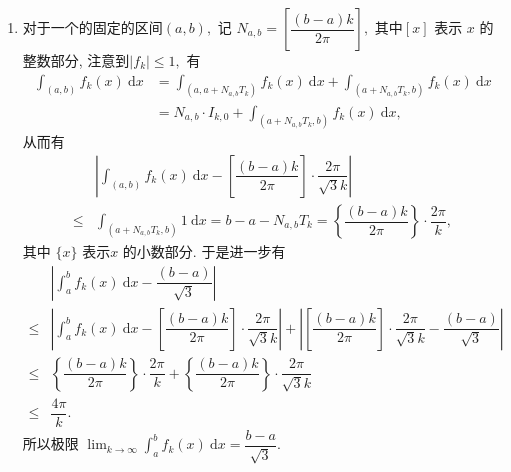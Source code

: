 \begin{solution}
\begin{enumerate}
\item 对于一个的固定的区间$(a, b),$ 记 $N_{a, b} = \left[\dfrac{(b-a)k}{2\pi} \right],$ 其中$[ x ]$ 表示 $x$ 的整数部分, 注意到$|f_k| \leqslant 1,$ 有
\begin{equation*}
\begin{aligned}
\int_{(a, b)} f_k(x) ~ \mathrm{d} x
& = \int_{(a, a + N_{a, b}T_k)} f_k(x) ~ \mathrm{d} x + \int_{(a + N_{a, b}T_k, b)} f_k(x) ~ \mathrm{d} x \\
& = N_{a, b} \cdot I_{k, 0} + \int_{(a + N_{a, b}T_k, b)} f_k(x) ~ \mathrm{d} x,
\end{aligned}
\end{equation*}
从而有
\begin{equation*}
\begin{aligned}
& \left\lvert \int_{(a, b)} f_k(x) ~ \mathrm{d} x - \left[\dfrac{(b-a)k}{2\pi} \right] \cdot \dfrac{2\pi}{\sqrt{3} k} \right\rvert \\
\leqslant & \int_{(a + N_{a, b}T_k, b)} 1 ~ \mathrm{d} x = b - a - N_{a, b}T_k
= \left\{ \dfrac{(b-a)k}{2\pi} \right\} \cdot \dfrac{2\pi}{k},
\end{aligned}
\end{equation*}
其中 $\{ x \}$ 表示$x$ 的小数部分. 于是进一步有
\begin{equation*}
\begin{aligned}
& \left\lvert \int_a^b f_k(x) ~ \mathrm{d} x - \dfrac{(b-a)}{\sqrt{3}} \right\rvert \\
\leqslant & \left\lvert \int_a^b f_k(x) ~ \mathrm{d} x - \left[\dfrac{(b-a)k}{2\pi} \right] \cdot \dfrac{2\pi}{\sqrt{3} k} \right\rvert
 + \left\lvert \left[\dfrac{(b-a)k}{2\pi} \right] \cdot \dfrac{2\pi}{\sqrt{3} k} - \dfrac{(b-a)}{\sqrt{3}} \right\rvert \\
\leqslant & \left\{ \dfrac{(b-a)k}{2\pi} \right\} \cdot \dfrac{2\pi}{k}
 + \left\{ \dfrac{(b-a)k}{2\pi} \right\} \cdot \dfrac{2\pi}{\sqrt{3} k} \\
\leqslant & \dfrac{4\pi}{k}.
\end{aligned}
\end{equation*}
所以极限 $\displaystyle \lim_{k\to\infty} \int_a^b f_k(x) ~ \mathrm{d} x = \dfrac{b-a}{\sqrt{3}}.$
\end{enumerate}
\end{solution}



